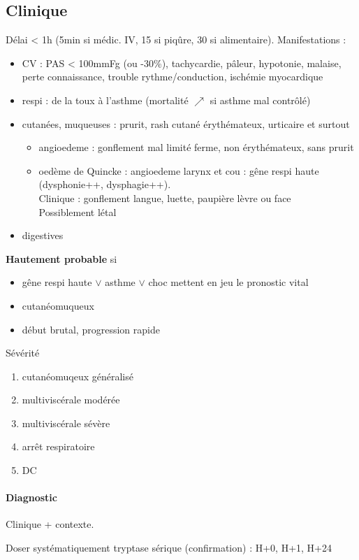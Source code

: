 \documentclass{article}
\begin{document}
\subsection{Clinique}
Délai < 1h (5min si médic. IV, 15 si piqûre, 30 si alimentaire).
Manifestations :
\begin{itemize}
\item CV : PAS < 100mmFg (ou -30\%), tachycardie, pâleur, hypotonie, malaise,
  perte connaissance, trouble rythme/conduction, ischémie myocardique
\item respi : de la toux à l'asthme (mortalité $\nearrow$ si asthme mal
  contrôlé)
\item cutanées, muqueuses : prurit, rash cutané érythémateux, urticaire et
  surtout 
  \begin{itemize}
  \item angioedeme : gonflement mal limité ferme, non érythémateux, sans
    prurit
  \item oedème de Quincke : angioedeme larynx et cou : gêne respi haute
    (dysphonie++, dysphagie++). \\
    Clinique : gonflement langue, luette, paupière lèvre ou face\\
    Possiblement létal \skull
  \end{itemize}
\item digestives
\end{itemize}
\textbf{Hautement probable}  si 
\begin{itemize}
\item gêne respi haute $\vee$ asthme $\vee$ choc
  mettent en jeu le pronostic vital
\item cutanéomuqueux
\item début brutal, progression rapide
\end{itemize}
Sévérité
\begin{enumerate}[label=\Roman*]
\item cutanéomuqeux généralisé
\item multiviscérale modérée
\item multiviscérale sévère
\item arrêt respiratoire
\item DC
\end{enumerate}

\paragraph{Diagnostic}
Clinique + contexte.

Doser systématiquement tryptase sérique (confirmation) : H+0, H+1, H+24
\end{document}
